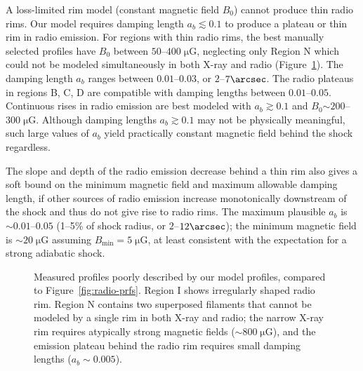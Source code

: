 \documentclass[manuscript]{aastex}  %
\newcommand*{\mt}{\mathrm}
\newcommand*{\unit}[1]{\;\mt{#1}}  %
\newcommand*{\abt}{\mathord{\sim}} %
\newcommand*{\Bmin}{B_{\mt{min}}}
\newcommand*{\muG}{\unit{\mu G}}
\begin{document}
A loss-limited rim model (constant magnetic field $B_0$) cannot produce thin
radio rims.  Our model requires damping length $a_b \lesssim 0.1$ to produce a
plateau or thin rim in radio emission.  For regions with thin radio rims, the
best manually selected profiles have $B_0$ between $50$--$400 \muG$, neglecting
only Region N which could not be modeled simultaneously in both X-ray and radio
(Figure~\ref{fig:radio-prfs-meh}).  The damping length $a_b$ ranges between
$0.01$--$0.03$, or $2$--$7\arcsec$.  The radio plateaus in regions B, C, D are
compatible with damping lengths between $0.01$--$0.05$.  Continuous rises in
radio emission are best modeled with $a_b \gtrsim 0.1$ and $B_0 \abt 200$--$300
\muG$.  Although damping lengths $a_b \gtrsim 0.1$ may not be physically
meaningful, such large values of $a_b$ yield practically constant magnetic
field behind the shock regardless.


The slope and depth of the radio emission decrease behind a thin rim also
gives a soft bound on the minimum magnetic field and maximum allowable damping
length, if other sources of radio emission increase monotonically downstream of
the shock and thus do not give rise to radio rims.  The maximum plausible $a_b$
is $\abt 0.01$--$0.05$ (1--5\% of shock radius, or $2$--$12\arcsec$); the
minimum magnetic field is $\abt 20 \muG$ assuming $\Bmin = 5 \muG$, at least
consistent with the expectation for a strong adiabatic shock.

\begin{figure}
    \centering
    \iftoggle{manuscript}{
        \epsscale{0.8}
        \plotone{figures/radio-fits-I.pdf} \\
        \plotone{figures/radio-fits-N.pdf}
        \epsscale{1}
    }{
        \texttt{[image: figures/radio-fits-I.pdf]} \\
        \texttt{[image: figures/radio-fits-N.pdf]}
    }
    \caption{Measured profiles poorly described by our model profiles, compared
    to Figure~\ref{fig:radio-prfs}.  Region I shows irregularly shaped radio
    rim.  Region N contains two superposed filaments that cannot be modeled by
    a single rim in both X-ray and radio; the narrow X-ray rim requires
    atypically strong magnetic fields ($\sim 800 \muG$), and the emission
    plateau behind the radio rim requires small damping lengths ($a_b \sim
    0.005$).
    \label{fig:radio-prfs-meh}}
\end{figure}
\end{document}
